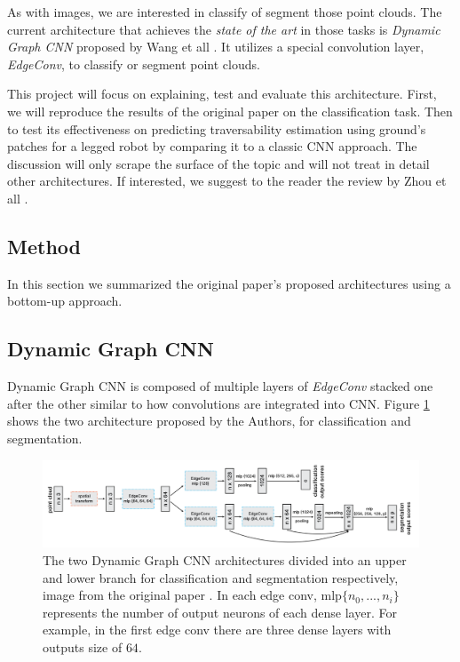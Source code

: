 \documentclass[twocolumn,showpacs,
  nofootinbib,aps,superscriptaddress,
  eqsecnum,prd,notitlepage,showkeys,10pt]{revtex4-1}
\begin{document}
As with images, we are interested in classify of segment those point clouds. The current architecture that achieves the \emph{state of the art} in those tasks is \emph{Dynamic Graph CNN} proposed by Wang et all \cite{dgcnn}. It utilizes a special convolution layer,  \emph{EdgeConv}, to classify or segment point clouds. 

This project will focus on explaining, test and evaluate this architecture. First, we will reproduce the results of the original paper on the classification task. Then to test its effectiveness on predicting traversability estimation using ground's patches for a legged robot by comparing it to a classic CNN approach. The discussion will only scrape the surface of the topic and will not treat in detail other architectures. If interested, we suggest to the reader the review by Zhou et all \cite{1812.08434}.
\subsection{Method}
In this section we summarized the original paper's proposed architectures using a bottom-up approach.
\subsection{Dynamic Graph CNN}
Dynamic Graph CNN is composed of multiple layers of \emph{EdgeConv} stacked one after the other similar to how convolutions are integrated into CNN. Figure \ref{fig : DGCNN} shows the two architecture proposed by the Authors, for classification and segmentation. 
\begin{figure}
  \centering
  \includegraphics[width=\linewidth]{images/DGCNN.png}
\caption{The two Dynamic Graph CNN architectures divided into an upper and lower branch for classification and segmentation respectively, image from the original paper \cite{dgcnn}. In each edge conv, mlp$\{n_0, ..., n_{i}\}$ represents the number of output neurons of each dense layer. For example, in the first edge conv there are three dense layers with outputs size of $64$.}
\label{fig : DGCNN}
\end{figure}
\end{document}
